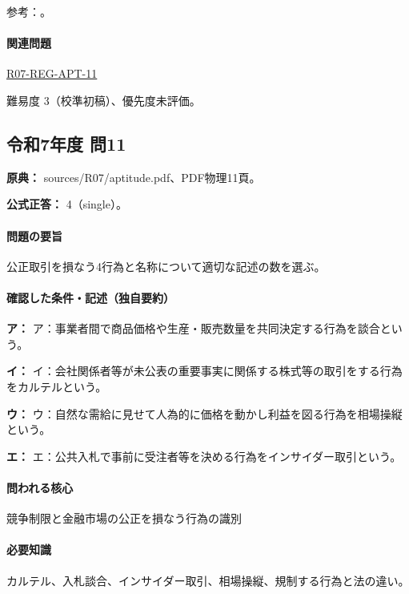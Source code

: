 \par 参考：\cite{jftc_rules,jftc_bid_cartel2021,fsa_market2004,fsa_information}。

\paragraph{関連問題} \hyperref[q:r07-reg-apt-11]{R07-REG-APT-11}

\par 難易度 3（校準初稿）、優先度未評価。

\subsection{令和7年度 問11}
\label{q:r07-reg-apt-11}

\noindent\textbf{原典：} sources/R07/aptitude.pdf、PDF物理11頁。

\textbf{公式正答：} 4（single）。

\paragraph{問題の要旨} 公正取引を損なう4行為と名称について適切な記述の数を選ぶ。

\paragraph{確認した条件・記述（独自要約）}\mbox{}\par

\noindent\textbf{ア：} ア：事業者間で商品価格や生産・販売数量を共同決定する行為を談合という。\par

\noindent\textbf{イ：} イ：会社関係者等が未公表の重要事実に関係する株式等の取引をする行為をカルテルという。\par

\noindent\textbf{ウ：} ウ：自然な需給に見せて人為的に価格を動かし利益を図る行為を相場操縦という。\par

\noindent\textbf{エ：} エ：公共入札で事前に受注者等を決める行為をインサイダー取引という。\par

\paragraph{問われる核心} 競争制限と金融市場の公正を損なう行為の識別

\paragraph{必要知識} カルテル、入札談合、インサイダー取引、相場操縦、規制する行為と法の違い。

